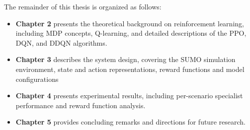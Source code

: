 The remainder of this thesis is organized as follows:

\begin{itemize}
    \item \textbf{Chapter 2} presents the theoretical background on reinforcement
    learning, including MDP concepts, Q-learning, and detailed descriptions of the
    PPO, DQN, and DDQN algorithms.

    \item \textbf{Chapter 3} describes the system design, covering the SUMO
    simulation environment, state and action representations, reward functions and
    model configurations

    \item \textbf{Chapter 4} presents experimental results, including per-scenario
    specialist performance and reward function analysis.

    \item \textbf{Chapter 5} provides concluding remarks and directions for future
    research.
\end{itemize}